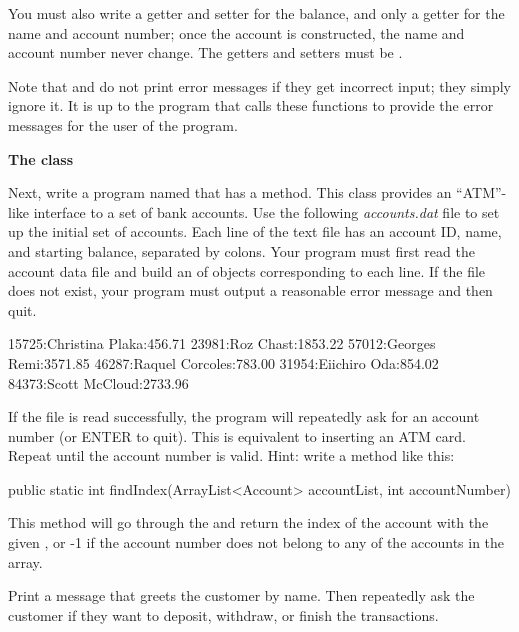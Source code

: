 \begin{exercise}
You must also write a getter and setter for the balance, and only a getter for the name and account number; once the account is constructed, the name and account number never change. The getters and setters must be .

Note that  and  do not print error messages if they get incorrect input; they simply ignore it. It is up to the program that calls these functions to provide the error messages for the user of the program.

{\large\bf{The  class}}

Next, write a program named  that has a  method. This class provides an ``ATM''-like interface to a set of bank accounts. Use the following {\em accounts.dat} file to set up the initial set of accounts. Each line of the text file has an account ID, name, and starting balance, separated by colons. Your program must first read the account data file and build an  of  objects corresponding to each line. If the file does not exist, your program must output a reasonable error message and then quit.

\begin{stdout}
15725:Christina Plaka:456.71
23981:Roz Chast:1853.22
57012:Georges Remi:3571.85
46287:Raquel Corcoles:783.00
31954:Eiichiro Oda:854.02
84373:Scott McCloud:2733.96
\end{stdout}

If the file is read successfully, the program will repeatedly ask for an account number (or ENTER to quit). This is equivalent to inserting an ATM card. Repeat until the account number is valid. Hint: write a method like this:

\begin{stdout}
public static int findIndex(ArrayList<Account> accountList,
   int accountNumber)
\end{stdout}

This method will go through the  and return the index of the account with the given , or -1 if the account number does not belong to any of the accounts in the array.

Print a message that greets the customer by name. Then repeatedly ask the customer if they want to deposit, withdraw, or finish the transactions.


\end{exercise}
